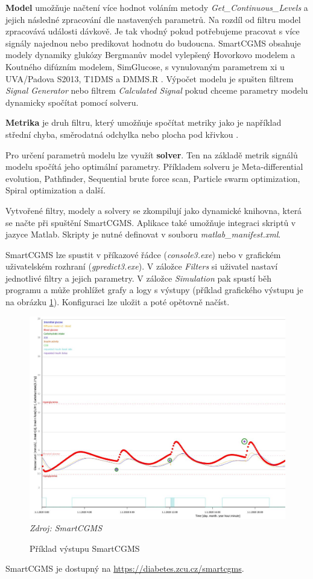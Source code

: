 \textbf{Model} umožňuje načtení více hodnot voláním metody \textit{Get\_Continuous\_Levels} a jejich následné zpracování dle nastavených parametrů. Na rozdíl od filtru model zpracovává události dávkově. Je tak vhodný pokud potřebujeme pracovat s více signály najednou nebo predikovat hodnotu do budoucna. SmartCGMS obsahuje modely dynamiky glukózy Bergmanův model vylepšený Hovorkovo modelem a Koutného difúzním modelem, SimGlucose, s vynulovaným parametrem xi u UVA/Padova S2013, T1DMS a DMMS.R \citep{cgms.web}. Výpočet modelu je spušten filtrem \textit{Signal Generator} nebo filtrem \textit{Calculated Signal} pokud chceme  parametry modelu dynamicky spočítat pomocí solveru.

\textbf{Metrika} je druh filtru, který umožňuje spočítat metriky jako je například střední chyba, směrodatná odchylka nebo plocha pod křivkou \citep{cgms.koutny}.

Pro určení parametrů modelu lze využít \textbf{solver}. Ten na základě metrik signálů modelu spočítá jeho optimální parametry. Příkladem solveru je Meta-differential evolution, Pathfinder, Sequential brute force scan, Particle swarm optimization, Spiral optimization a další.

Vytvořené filtry, modely a solvery se zkompilují jako dynamické knihovna, která se načte při spuštění SmartCGMS. Aplikace také umožňuje integraci skriptů v jazyce Matlab. Skripty je nutné definovat v souboru \textit{matlab\_manifest.xml}.

SmartCGMS lze spustit v příkazové řádce (\textit{console3.exe}) nebo v grafickém uživatelském rozhraní (\textit{gpredict3.exe}). V záložce \textit{Filters} si uživatel nastaví jednotlivé filtry a jejich parametry. V záložce \textit{Simulation} pak spustí běh programu a může prohlížet grafy a logy s výstupy (příklad grafického výstupu je na obrázku \ref{fig:scgms_graf}). Konfiguraci lze uložit a poté opětovně načíst.

\begin{figure}[H]
\caption{Příklad výstupu SmartCGMS}
\label{fig:scgms_graf}
\centering
\includegraphics[width=1\textwidth]{img/scgms/graf1.jpg}
\textit{Zdroj: SmartCGMS}
\end{figure}

SmartCGMS je dostupný na \url{https://diabetes.zcu.cz/smartcgms}.